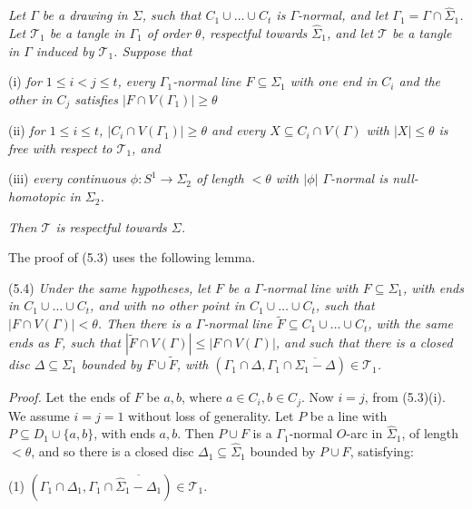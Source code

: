 \textit{Let $\Gamma$ be a drawing in $\Sigma$, such that $C_1 \cup \dots \cup C_t$ is $\Gamma$-normal, and let $\Gamma_1 = \Gamma \cap \hat{\Sigma}_1$. Let $\mathscr{T}_1$ be a tangle in $\Gamma_1$ of order $\theta$, respectful towards $\hat{\Sigma}_1$, and let $\mathscr{T}$ be a tangle in $\Gamma$ induced by $\mathscr{T}_1$. Suppose that}

\hspace*{12pt}(i) \textit{for $1 \le i < j \le t$, every $\Gamma_1$-normal line $F \subseteq \Sigma_1$ with one end in $C_i$ and the other in $C_j$ satisfies $|F \cap V(\Gamma_1)| \ge \theta$}

\hspace*{12pt}(ii) \textit{for $1 \le i \le t$, $|C_i \cap V(\Gamma_1)| \ge \theta$ and every $X \subseteq C_i \cap V(\Gamma)$ with $|X| \le \theta$ is free with respect to $\mathscr{T}_1$, and}

\hspace*{12pt}(iii) \textit{every continuous $\phi \colon S^1 \to \Sigma_2$ of length $< \theta$ with $|\phi|$ $\Gamma$-normal is null-homotopic in $\Sigma_2$.}

\textit{Then $\mathscr{T}$ is respectful towards $\Sigma$.}

The proof of (5.3) uses the following lemma.

\stmt
(5.4) \textit{Under the same hypotheses, let $F$ be a $\Gamma$-normal line with $F \subseteq \Sigma_1$, with ends in $C_1 \cup \dots \cup C_t$, and with no other point in $C_1 \cup \dots \cup C_t$, such that $|F \cap V(\Gamma)| < \theta$. Then there is a $\Gamma$-normal line $\tilde{F} \subseteq C_1 \cup \dots \cup C_t$, with the same ends as $F$, such that $|\tilde{F} \cap V(\Gamma)| \le |F \cap V(\Gamma)|$, and such that there is a closed disc $\Delta \subseteq \Sigma_1$ bounded by $F \cup \tilde{F}$, with $(\Gamma_1 \cap \Delta, \Gamma_1 \cap \overline{\Sigma_1 - \Delta}) \in \mathscr{T}_1$.}

\textit{Proof.} Let the ends of $F$ be $a, b$, where $a \in C_i, b \in C_j$. Now $i = j$, from (5.3)(i). We assume $i = j = 1$ without loss of generality. Let $P$ be a line with $P \subseteq D_1 \cup \{a, b\}$, with ends $a, b$. Then $P \cup F$ is a $\Gamma_1$-normal $O$-arc in $\hat{\Sigma}_1$, of length $< \theta$, and so there is a closed disc $\Delta_1 \subseteq \hat{\Sigma}_1$ bounded by $P \cup F$, satisfying:

\hspace*{12pt}(1) $(\Gamma_1 \cap \Delta_1, \Gamma_1 \cap \overline{\hat{\Sigma}_1 - \Delta_1}) \in \mathscr{T}_1.$

